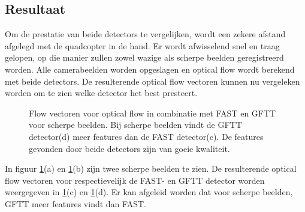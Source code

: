\subsection{Resultaat}
Om de prestatie van beide detectors te vergelijken, wordt een zekere afstand afgelegd met de quadcopter in de hand. Er wordt afwisselend snel en traag gelopen, op die manier zullen zowel wazige als scherpe beelden geregistreerd worden. Alle camerabeelden worden opgeslagen en optical flow wordt berekend met beide detectors. De resulterende optical flow vectoren kunnen nu vergeleken worden om te zien welke detector het best presteert.

\begin{figure}
\begin{center}

\hspace{0.01\linewidth}
\end{center}

\begin{center}
\hspace{0.01\linewidth}
\end{center}
\centering
\caption{Flow vectoren voor optical flow in combinatie met FAST en GFTT voor scherpe beelden. Bij scherpe beelden vindt de GFTT detector(d) meer features dan de FAST detector(c). De features gevonden door beide detectors zijn van goeie kwaliteit.}\label{fig:scherp}
\end{figure}


\npar In figuur \ref{fig:scherp}(a) en \ref{fig:scherp}(b) zijn twee scherpe beelden te zien. De resulterende optical flow vectoren voor respectievelijk de FAST- en GFTT detector worden weergegeven in \ref{fig:scherp}(c) en \ref{fig:scherp}(d). Er kan afgeleid worden dat voor scherpe beelden, GFTT meer features vindt dan FAST.

